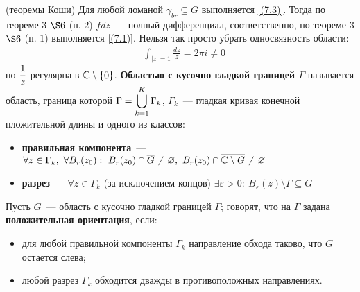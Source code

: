 \pr (теоремы Коши)
Для любой ломаной $\gamma_{br}\subseteq G$ выполняется \eqref{(7.3)}.
Тогда по теореме $3$ $\S 6$ (п. $2$) $f dz$~--- полный дифференциал,
соответственно, по теореме $3$ $\S 6$ (п. $1$) выполняется \eqref{(7.1)}.
\note
Нельзя так просто убрать односвязность области:
\begin{align*}
  & \int_{\left| z \right| = 1} \frac{dz}{z} = 2 \pi i \neq 0
\end{align*}
но $\displaystyle \frac{1}{z}$ регулярна в $\mathbb{C} \setminus \{0\}$.
\Def
\textbf{Областью с кусочно гладкой границей $\Gamma$} называется область,
граница которой $\Gamma = \displaystyle \bigcup_{k=1}^K\Gamma_k$, $\Gamma_k$~--- гладкая
кривая конечной пложительной длины и одного из классов:
\begin{itemize}
    \item \textbf{правильная компонента}~--- $\forall z \in \Gamma_k, \ \forall
    B_r(z_0): \ B_r(z_0)\cap \overline{G} \neq \varnothing, \ B_r(z_0) \cap
    \overline{\mathbb{C}\setminus G} \neq \varnothing$
    \item \textbf{разрез}~--- $\forall z \in \Gamma_k$ (за исключением концов)
    $\exists \varepsilon > 0: \ B_{\varepsilon}(z) \setminus \Gamma \subseteq G$
\end{itemize}
\Def
Пусть $G$~--- область с кусочно гладкой границей $\Gamma$; говорят, что на
$\Gamma$ задана \textbf{положительная ориентация}, если:
\begin{itemize}
    \item для любой правильной компоненты $\Gamma_k$ направление обхода таково,
    что $G$ остается слева;
    \item любой разрез $\Gamma_k$ обходится дважды в противоположных
    направлениях.
\end{itemize}

